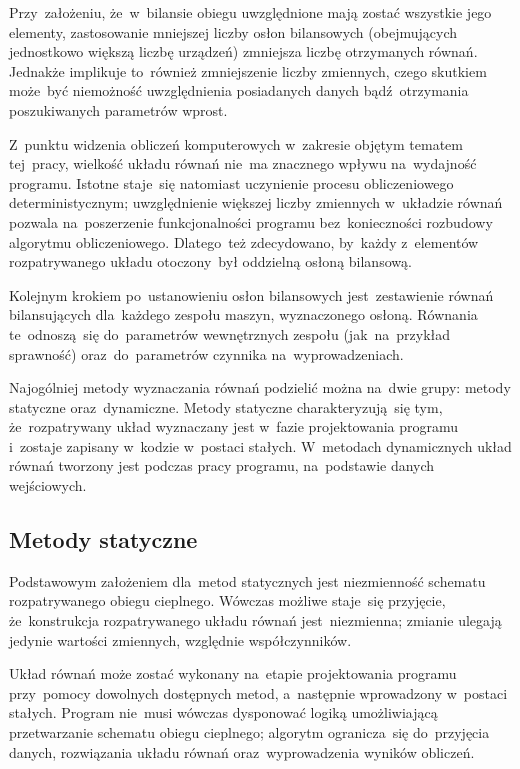 Przy~założeniu, że~w~bilansie obiegu uwzględnione mają zostać wszystkie
jego elementy, zastosowanie mniejszej liczby osłon bilansowych
(obejmujących jednostkowo większą liczbę urządzeń) zmniejsza liczbę
otrzymanych równań. Jednakże implikuje to~również zmniejszenie liczby
zmiennych, czego skutkiem może~być niemożność uwzględnienia posiadanych
danych bądź~otrzymania poszukiwanych parametrów wprost.

Z~punktu widzenia obliczeń komputerowych w~zakresie objętym tematem
tej~pracy, wielkość układu równań nie~ma znacznego wpływu na~wydajność
programu. Istotne staje~się natomiast uczynienie procesu obliczeniowego
deterministycznym; uwzględnienie większej liczby zmiennych w~układzie
równań pozwala na~poszerzenie funkcjonalności programu bez~konieczności
rozbudowy algorytmu obliczeniowego. Dlatego~też zdecydowano, by~każdy
z~elementów rozpatrywanego układu otoczony~był oddzielną osłoną
bilansową.

Kolejnym krokiem po~ustanowieniu osłon bilansowych jest~zestawienie
równań bilansujących dla~każdego zespołu maszyn, wyznaczonego osłoną.
Równania te~odnoszą~się do~parametrów wewnętrznych zespołu
(jak~na~przykład sprawność) oraz~do~parametrów czynnika
na~wyprowadzeniach.

Najogólniej metody wyznaczania równań podzielić można na~dwie grupy:
metody statyczne oraz~dynamiczne. Metody statyczne charakteryzują~się
tym, że~rozpatrywany układ wyznaczany jest w~fazie projektowania
programu i~zostaje zapisany w~kodzie w~postaci stałych. W~metodach
dynamicznych układ równań tworzony jest podczas pracy programu,
na~podstawie danych wejściowych.


\subsection{Metody statyczne}

Podstawowym założeniem dla~metod statycznych jest niezmienność schematu
rozpatrywanego obiegu cieplnego. Wówczas możliwe staje~się przyjęcie,
że~konstrukcja rozpatrywanego układu równań jest~niezmienna; zmianie
ulegają jedynie wartości zmiennych, względnie współczynników.

Układ równań może zostać wykonany na~etapie projektowania programu
przy~pomocy dowolnych dostępnych metod, a~następnie wprowadzony
w~postaci stałych. Program nie~musi wówczas dysponować logiką
umożliwiającą przetwarzanie schematu obiegu cieplnego; algorytm
ogranicza~się do~przyjęcia danych, rozwiązania układu równań
oraz~wyprowadzenia wyników obliczeń.

